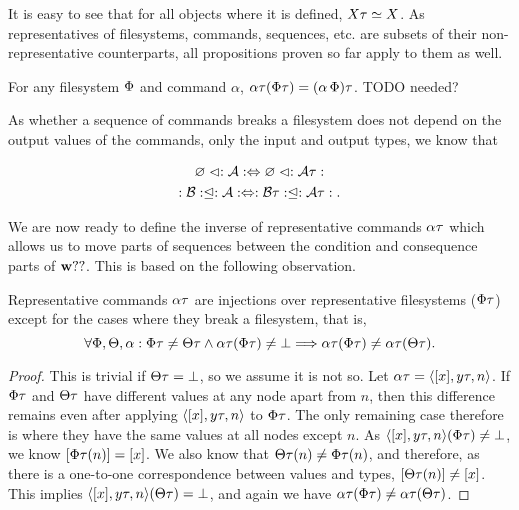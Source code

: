 It is easy to see that for all objects where it is defined, $X\T\typeeq X$.
As representatives of filesystems, commands, sequences, etc.
are subsets of their non-representative counterparts, all
propositions proven so far apply to them as well.

\begin{mycor}
For any filesystem $\FS$ and command $\alpha$, 
$\alpha\T(\FS\T) = (\alpha\aFS)\T$.
TODO needed?
\end{mycor}


As whether a sequence of commands breaks a filesystem does not depend on the output values
of the commands, only the input and output types, we know that
\begin{mycor}\label{repr_works_is_same}
\begin{gather*}
\works{\seqset{A}} \Leftrightarrow \works{\seqset{A}\T} \\
\worksc{\seqset{A}}{\seqset{B}} \Leftrightarrow \worksc{\seqset{A}\T}{\seqset{B}\T}.
\end{gather*}
\end{mycor}


We are now ready to define the inverse of representative commands $\alpha\T$
which allows us to move parts of sequences between the
condition and consequence parts of $\workssign$.
This is based on the following observation.

\begin{mylem}\label{repr_comm_inject}
Representative commands $\alpha\T$ are injections over representative filesystems ($\FS\T$)
except for the cases where they break a filesystem, that is,
\[ \forall\FS,\GS,\alpha: \FS\T\neq\GS\T \wedge \alpha\T(\FS\T)\neq\fsbroken \Longrightarrow \alpha\T(\FS\T) \neq \alpha\T(\GS\T). \]
\end{mylem}
\begin{proof}
This is trivial if $\GS\T=\fsbroken$, so we assume it is not so.
Let $\alpha\T = \cTxynv$.
If $\FS\T$ and $\GS\T$ have different values at any node apart from $n$, then this difference remains
even after applying $\cTxynv$ to $\FS\T$. The only remaining case therefore is where they have the same values
at all nodes except $n$.
As $\cTxynv(\FS\T)\neq\fsbroken$, we know $[\FS\T(n)]=[x]$.
We also know that $\GS\T(n)\neq\FS\T(n)$, and therefore, as there is a one-to-one correspondence between values and types,
$[\GS\T(n)]\neq[x]$.
This implies $\cTxynv(\GS\T)=\fsbroken$,
and again we have $\alpha\T(\FS\T) \neq \alpha\T(\GS\T)$.
\end{proof}

